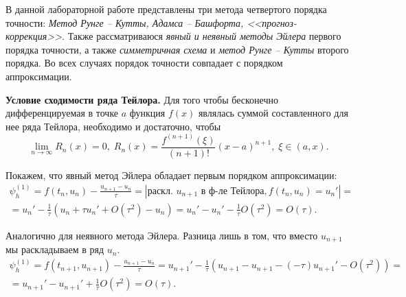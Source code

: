 \documentclass[12pt, a4paper]{article}
\begin{document}
\begin{enumerate}
		В данной лабораторной работе представлены три метода четвертого порядка точности: \textit{Метод Рунге -- Кутты, Адамса -- Башфорта, <<прогноз-коррекция>>}. Также рассматриваюся \textit{явный и неявный методы Эйлера} первого порядка точности, а также \textit{симметричная схема} и \textit{метод Рунге -- Кутты} второго порядка. Во всех случаях порядок точности совпадает с порядком аппроксимации.
		
		\textbf{Условие сходимости ряда Тейлора.} Для того чтобы бесконечно дифференцируемая в точке $a$ функция $f(x)$ являлась суммой составленного для нее ряда Тейлора, необходимо и достаточно, чтобы \[\lim\limits_{n\to\infty}R_n(x)=0,\;R_n(x)=\frac{f^{(n+1)}(\xi)}{(n+1)!}(x-a)^{n+1},\;\xi \in (a,x).\]
		
		
		Покажем, что явный метод Эйлера обладает первым порядком аппроксимации:
		\begin{multline*}
			\psi_h^{(1)} = f(t_n, u_n) - \frac{u_{n+1}-u_n}{\tau} = |\text{раскл. $u_{n+1}$ в ф-ле Тейлора}, f(t_n, u_n) = u_n'| = \\
			= u_n' - \frac1\tau \left(u_n + \tau u_n' + O(\tau^2) - u_n \right) = u_n' - u_n' - \frac1\tau O(\tau^2) = O(\tau).
		\end{multline*}
		
		Аналогично для неявного метода Эйлера. Разница лишь в том, что вместо $u_{n+1}$ мы раскладываем в ряд $u_n$.
		\begin{multline*}
			\psi_h^{(1)} = f(t_{n+1}, u_{n+1}) - \frac{u_{n+1}-u_n}{\tau}  = u_{n+1}' - \frac1\tau \left(u_{n+1} - u_{n+1}  - (-\tau) u_{n+1}' - O(\tau^2) \right) = \\
			= u_{n+1}' - u_{n+1}' + \frac1\tau O(\tau^2) = O(\tau).
		\end{multline*}
		

\end{enumerate}
\end{document}
